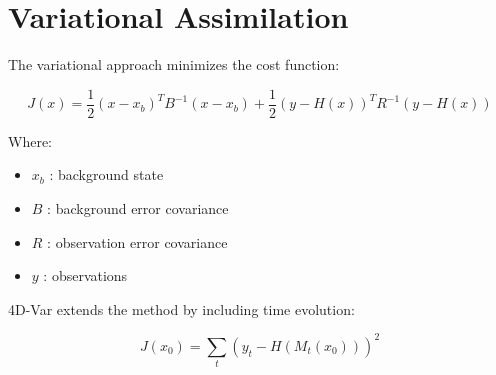 \section{Variational Assimilation}


The variational approach minimizes the cost function:


\begin{equation}
J(x)
=
\frac{1}{2}(x-x_b)^TB^{-1}(x-x_b)
+
\frac{1}{2}(y-H(x))^TR^{-1}(y-H(x))
\end{equation}



Where:


\begin{itemize}

\item $x_b$ : background state

\item $B$ : background error covariance

\item $R$ : observation error covariance

\item $y$ : observations

\end{itemize}



4D-Var extends the method by including time evolution:


\begin{equation}
J(x_0)
=
\sum_t
(y_t-H(M_t(x_0)))^2
\end{equation}
